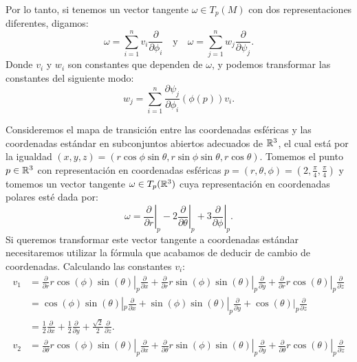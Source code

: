 Por lo tanto, si tenemos un vector tangente $\omega \in T_p(M)$ con dos representaciones diferentes, digamos:
\[
	\omega = \sum_{i=1}^{n} v_i \frac{\partial}{\partial \phi_i}
	\quad \text{y} \quad
	\omega = \sum_{j=1}^{n} w_j \frac{\partial}{\partial \psi_j}.
\]
Donde $v_i$ y $w_i$ son constantes que dependen de $\omega$, y podemos transformar las constantes del siguiente modo:
\[
	w_j = \sum_{i=1}^{n} \frac{\partial \psi_j}{\partial \phi_i} (\phi(p)) v_i.
\]

\begin{example}
	Consideremos el mapa de transición entre las coordenadas esféricas y las coordenadas estándar en subconjuntos abiertos adecuados de $\mathbb{R}^{3}$, el cual está por la igualdad $(x,y,z) = (r \cos \phi \sin \theta, r \sin \phi \sin \theta, r\cos \theta)$. Tomemos el punto $p \in \mathbb{R}^{3}$ con representación en coordenadas esféricas $p = (r,\theta,\phi) = (2,\frac{\pi}{4},\frac{\pi}{4})$ y tomemos un vector tangente $\omega \in T_p(\mathbb{R}^3)$ cuya representación en coordenadas polares esté dada por:
	\[
		\omega = \left. \frac{\partial}{\partial r} \right|_p -
		\left. 2\frac{\partial}{\partial \theta} \right|_p +
		\left. 3\frac{\partial}{\partial \phi} \right|_p.
	\]
	Si queremos transformar este vector tangente a coordenadas estándar necesitaremos utilizar la fórmula que acabamos de deducir de cambio de coordenadas. Calculando las constantes $v_i$:
	\begin{align*}
		v_1 & =
		\left. \frac{\partial}{\partial r} r\cos(\phi)\sin(\theta) \right|_p
		\frac{\partial}{\partial x} +
		\left. \frac{\partial}{\partial r} r\sin(\phi)\sin(\theta)\right|_p
		\frac{\partial}{\partial y} +
		\left. \frac{\partial}{\partial r}r\cos(\theta)\right|_{p}
		\frac{\partial}{\partial z}                                          \\
		    & = \cos(\phi)\sin(\theta)|_p \frac{\partial}{\partial x}
		+ \sin(\phi)\sin(\theta)|_p  \frac{\partial}{\partial y}
		+ \cos(\theta)|_p \frac{\partial}{\partial z}                        \\
		    & = \frac{1}{2} \frac{\partial}{\partial x}
		+ \frac{1}{2} \frac{\partial}{\partial y}
		+ \frac{\sqrt{2}}{2} \frac{\partial}{\partial z}.                    \\
		v_2 & =
		\left. \frac{\partial}{\partial \theta} r\cos(\phi)\sin(\theta) \right|_p
		\frac{\partial}{\partial x} +
		\left. \frac{\partial}{\partial \theta} r\sin(\phi)\sin(\theta)\right|_p
		\frac{\partial}{\partial y} +
		\left. \frac{\partial}{\partial \theta}r\cos(\theta)\right|_{p}
		\frac{\partial}{\partial z}                                          \\

\end{align*}
\end{example}
